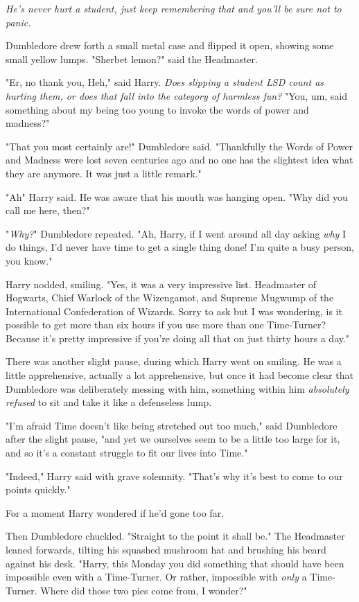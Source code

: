\emph{He's never hurt a student, just keep remembering that and you'll be sure
not to panic.}

Dumbledore drew forth a small metal case and flipped it open, showing some
small yellow lumps. "Sherbet lemon?" said the Headmaster.

"Er, no thank you, Heh," said Harry. \emph{Does slipping a student LSD count as
hurting them, or does that fall into the category of harmless fun?} "You, um,
said something about my being too young to invoke the words of power and
madness?"

"That you most certainly are!" Dumbledore said. "Thankfully the Words of Power
and Madness were lost seven centuries ago and no one has the slightest idea
what they are anymore. It was just a little remark."

"Ah{\el}" Harry said. He was aware that his mouth was hanging open. "Why did
you call me here, then?"

"\emph{Why?}" Dumbledore repeated. "Ah, Harry, if I went around all day asking
\emph{why} I do things, I'd never have time to get a single thing done! I'm
quite a busy person, you know."

Harry nodded, smiling. "Yes, it was a very impressive list. Headmaster of
Hogwarts, Chief Warlock of the Wizengamot, and Supreme Mugwump of the
International Confederation of Wizards. Sorry to ask but I was wondering, is it
possible to get more than six hours if you use more than one Time-Turner?
Because it's pretty impressive if you're doing all that on just thirty hours a
day."

There was another slight pause, during which Harry went on smiling. He was a
little apprehensive, actually a lot apprehensive, but once it had become clear
that Dumbledore was deliberately messing with him, something within him
\emph{absolutely refused} to sit and take it like a defenseless lump.

"I'm afraid Time doesn't like being stretched out too much," said Dumbledore
after the slight pause, "and yet we ourselves seem to be a little too large for
it, and so it's a constant struggle to fit our lives into Time."

"Indeed," Harry said with grave solemnity. "That's why it's best to come to our
points quickly."

For a moment Harry wondered if he'd gone too far.

Then Dumbledore chuckled. "Straight to the point it shall be." The Headmaster
leaned forwards, tilting his squashed mushroom hat and brushing his beard
against his desk. "Harry, this Monday you did something that should have been
impossible even with a Time-Turner. Or rather, impossible with \emph{only} a
Time-Turner. Where did those two pies come from, I wonder?"


